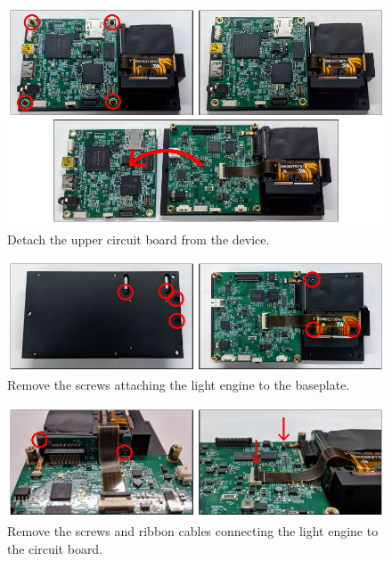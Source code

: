\begin{figure}
    \includegraphics{figures/appendix_b/dmd_mod_1.pdf}
    \caption {
        \label{fig:dmd_mod_1}
        Detach the upper circuit board from the device.
    }
\end{figure}

\begin{figure}
    \includegraphics{figures/appendix_b/dmd_mod_2.pdf}
    \caption {
        \label{fig:dmd_mod_2}
        Remove the screws attaching the light engine to the baseplate.
    }
\end{figure}

\begin{figure}
    \includegraphics{figures/appendix_b/dmd_mod_3.pdf}
    \caption {
        \label{fig:dmd_mod_3}
        Remove the screws and ribbon cables connecting the light engine to the circuit board.
    }
\end{figure}

